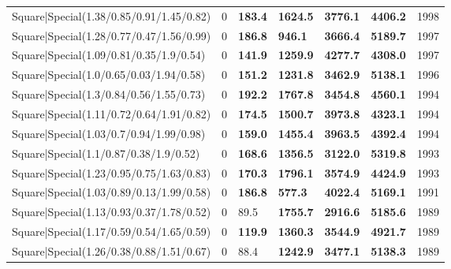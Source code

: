 \begin{tabular}{lrllllr}
 Square|Special(1.38/0.85/0.91/1.45/0.82)                      &             0   & \textbf{183.4} & \textbf{1624.5} & \textbf{3776.1} & \textbf{4406.2} &         1998 \\
 Square|Special(1.28/0.77/0.47/1.56/0.99)                      &             0   & \textbf{186.8} & \textbf{946.1}  & \textbf{3666.4} & \textbf{5189.7} &         1997 \\
 Square|Special(1.09/0.81/0.35/1.9/0.54)                       &             0   & \textbf{141.9} & \textbf{1259.9} & \textbf{4277.7} & \textbf{4308.0} &         1997 \\
 Square|Special(1.0/0.65/0.03/1.94/0.58)                       &             0   & \textbf{151.2} & \textbf{1231.8} & \textbf{3462.9} & \textbf{5138.1} &         1996 \\
 Square|Special(1.3/0.84/0.56/1.55/0.73)                       &             0   & \textbf{192.2} & \textbf{1767.8} & \textbf{3454.8} & \textbf{4560.1} &         1994 \\
 Square|Special(1.11/0.72/0.64/1.91/0.82)                      &             0   & \textbf{174.5} & \textbf{1500.7} & \textbf{3973.8} & \textbf{4323.1} &         1994 \\
 Square|Special(1.03/0.7/0.94/1.99/0.98)                       &             0   & \textbf{159.0} & \textbf{1455.4} & \textbf{3963.5} & \textbf{4392.4} &         1994 \\
 Square|Special(1.1/0.87/0.38/1.9/0.52)                        &             0   & \textbf{168.6} & \textbf{1356.5} & \textbf{3122.0} & \textbf{5319.8} &         1993 \\
 Square|Special(1.23/0.95/0.75/1.63/0.83)                      &             0   & \textbf{170.3} & \textbf{1796.1} & \textbf{3574.9} & \textbf{4424.9} &         1993 \\
 Square|Special(1.03/0.89/0.13/1.99/0.58)                      &             0   & \textbf{186.8} & \textbf{577.3}  & \textbf{4022.4} & \textbf{5169.1} &         1991 \\
 Square|Special(1.13/0.93/0.37/1.78/0.52)                      &             0   & 89.5           & \textbf{1755.7} & \textbf{2916.6} & \textbf{5185.6} &         1989 \\
 Square|Special(1.17/0.59/0.54/1.65/0.59)                      &             0   & \textbf{119.9} & \textbf{1360.3} & \textbf{3544.9} & \textbf{4921.7} &         1989 \\
 Square|Special(1.26/0.38/0.88/1.51/0.67)                      &             0   & 88.4           & \textbf{1242.9} & \textbf{3477.1} & \textbf{5138.3} &         1989 \\

\end{tabular}
